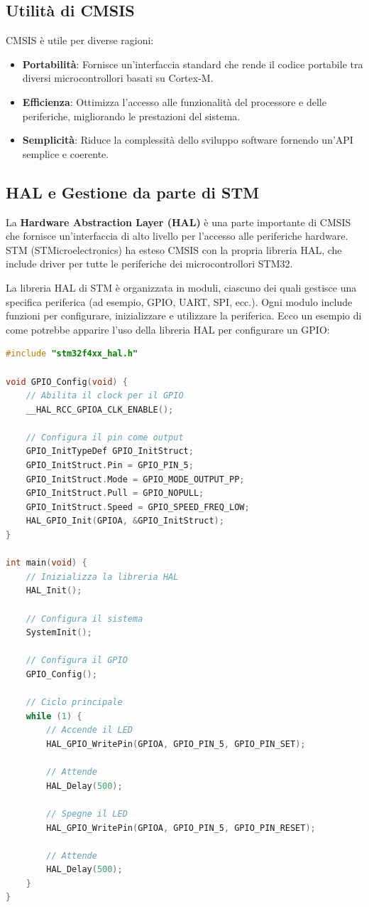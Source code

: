 \documentclass{article}
\begin{document}
\subsection{Utilità di CMSIS}
CMSIS è utile per diverse ragioni:
\begin{itemize}
    \item \textbf{Portabilità}: Fornisce un'interfaccia standard che rende il codice portabile tra diversi microcontrollori basati su Cortex-M.
    \item \textbf{Efficienza}: Ottimizza l'accesso alle funzionalità del processore e delle periferiche, migliorando le prestazioni del sistema.
    \item \textbf{Semplicità}: Riduce la complessità dello sviluppo software fornendo un'API semplice e coerente.
\end{itemize}

\subsection{HAL e Gestione da parte di STM}
La \textbf{Hardware Abstraction Layer (HAL)} è una parte importante di CMSIS che fornisce un'interfaccia di alto livello per l'accesso alle periferiche hardware. STM (STMicroelectronics) ha esteso CMSIS con la propria libreria HAL, che include driver per tutte le periferiche dei microcontrollori STM32.

La libreria HAL di STM è organizzata in moduli, ciascuno dei quali gestisce una specifica periferica (ad esempio, GPIO, UART, SPI, ecc.). Ogni modulo include funzioni per configurare, inizializzare e utilizzare la periferica. Ecco un esempio di come potrebbe apparire l'uso della libreria HAL per configurare un GPIO:

\begin{lstlisting}[language=C]
#include "stm32f4xx_hal.h"

void GPIO_Config(void) {
    // Abilita il clock per il GPIO
    __HAL_RCC_GPIOA_CLK_ENABLE();
    
    // Configura il pin come output
    GPIO_InitTypeDef GPIO_InitStruct;
    GPIO_InitStruct.Pin = GPIO_PIN_5;
    GPIO_InitStruct.Mode = GPIO_MODE_OUTPUT_PP;
    GPIO_InitStruct.Pull = GPIO_NOPULL;
    GPIO_InitStruct.Speed = GPIO_SPEED_FREQ_LOW;
    HAL_GPIO_Init(GPIOA, &GPIO_InitStruct);
}

int main(void) {
    // Inizializza la libreria HAL
    HAL_Init();
    
    // Configura il sistema
    SystemInit();
    
    // Configura il GPIO
    GPIO_Config();
    
    // Ciclo principale
    while (1) {
        // Accende il LED
        HAL_GPIO_WritePin(GPIOA, GPIO_PIN_5, GPIO_PIN_SET);
        
        // Attende
        HAL_Delay(500);
        
        // Spegne il LED
        HAL_GPIO_WritePin(GPIOA, GPIO_PIN_5, GPIO_PIN_RESET);
        
        // Attende
        HAL_Delay(500);
    }
}
\end{lstlisting}
\end{document}

